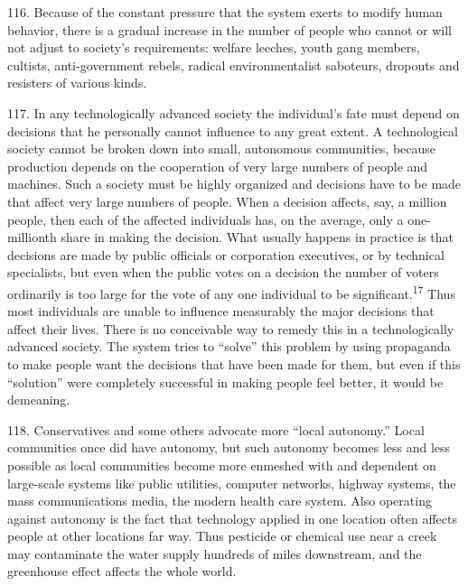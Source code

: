 \documentclass{article}
\begin{document}
116.  Because of the constant pressure that the system exerts to modify human behavior, there is a 
gradual increase in the number of people who cannot or will not adjust to society’s requirements: 
welfare leeches,  youth  gang members,  cultists, anti-government rebels, radical environmentalist 
saboteurs, dropouts and resisters of various kinds. \vspace{\baselineskip}

117.  In any technologically advanced society the individual’s fate must depend on decisions that 
he personally cannot influence to any great extent.  A technological society cannot be broken down 
into small, autonomous communities, because production depends on the cooperation of very large 
numbers of people and machines.  Such a society must be highly organized and decisions have to 
be made that affect very large numbers of people.  When a decision affects, say, a million people, 
then each of the affected individuals has, on the average, only a one-millionth share in making the 
decision.   What  usually  happens  in  practice  is  that  decisions  are  made  by  public  officials  or 
corporation executives, or by technical specialists, but even when the public votes on a decision 
the number of voters ordinarily is too large for the vote of any one individual to be significant.\textsuperscript{17} 
Thus  most  individuals  are  unable  to  influence  measurably  the  major  decisions  that  affect  their  
lives.   There  is  no  conceivable  way  to  remedy  this  in  a  technologically  advanced  society.   The 
system tries to “solve” this problem by using propaganda to make people want the decisions that 
have been made for them, but even if this “solution” were completely successful in making people 
feel better, it would be demeaning. \vspace{\baselineskip}

118.  Conservatives and some others advocate more “local autonomy.” Local communities once 
did  have  autonomy,  but  such  autonomy  becomes  less  and  less  possible  as  local  communities  
become more enmeshed with and dependent on large-scale systems like public utilities, computer 
networks, highway systems, the mass communications media, the modern health care 
system.  Also operating against autonomy is the fact that technology applied in one location often 
affects  people  at  other  locations  far  way.   Thus  pesticide  or  chemical  use  near  a  creek  may  
contaminate the water supply hundreds of miles downstream, and the greenhouse effect affects the 
whole world. \vspace{\baselineskip}
 
\end{document}
